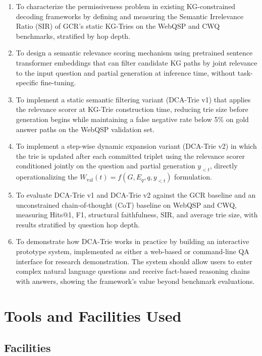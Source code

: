 \begin{enumerate}[label=\roman*.]
  \item To characterize the permissiveness problem in existing KG-constrained decoding frameworks by defining and measuring the Semantic Irrelevance Ratio (SIR) of GCR's static KG-Tries on the WebQSP and CWQ benchmarks, stratified by hop depth.
  \item To design a semantic relevance scoring mechanism using pretrained sentence transformer embeddings \citep{reimers2019sbert} that can filter candidate KG paths by joint relevance to the input question and partial generation at inference time, without task-specific fine-tuning.
  \item To implement a static semantic filtering variant (DCA-Trie v1) that applies the relevance scorer at KG-Trie construction time, reducing trie size before generation begins while maintaining a false negative rate below 5\% on gold answer paths on the WebQSP validation set.
  \item To implement a step-wise dynamic expansion variant (DCA-Trie v2) in which the trie is updated after each committed triplet using the relevance scorer conditioned jointly on the question and partial generation $y_{<t}$, directly operationalizing the $W_{\mathrm{val}}(t) = f(G, E_q, q, y_{<t})$ formulation.
  \item To evaluate DCA-Trie v1 and DCA-Trie v2 against the GCR baseline and an unconstrained chain-of-thought (CoT) baseline on WebQSP and CWQ, measuring Hits@1, F1, structural faithfulness, SIR, and average trie size, with results stratified by question hop depth.
  \item To demonstrate how DCA-Trie works in practice by building an interactive prototype system, implemented as either a web-based or command-line QA interface for research demonstration. The system should allow users to enter complex natural language questions and receive fact-based reasoning chains with answers, showing the framework's value beyond benchmark evaluations.
\end{enumerate}

\section{Tools and Facilities Used}

\subsection{Facilities}

